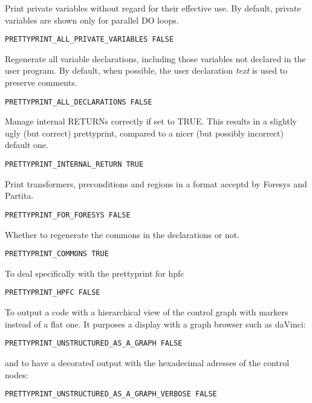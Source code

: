 Print private variables without regard for their effective use. By
default, private variables are shown only for parallel DO loops.

\begin{verbatim}
PRETTYPRINT_ALL_PRIVATE_VARIABLES FALSE
\end{verbatim}


Regenerate all variable declarations, including those variables not
declared in the user program. By default, when possible, the user
declaration {\em text} is used to preserve comments.

\begin{verbatim}
PRETTYPRINT_ALL_DECLARATIONS FALSE
\end{verbatim}

Manage internal RETURNs correctly if set to TRUE.  This results in a
slightly ugly (but correct) prettyprint, compared to a nicer (but
possibly incorrect) default one.

\begin{verbatim}
PRETTYPRINT_INTERNAL_RETURN TRUE
\end{verbatim}

Print transformers, preconditions and regions in a format acceptd by
Foresys and Partita.

\begin{verbatim}
PRETTYPRINT_FOR_FORESYS FALSE
\end{verbatim}

Whether to regenerate the commons in the declarations or not.

\begin{verbatim}
PRETTYPRINT_COMMONS TRUE
\end{verbatim}

To deal specifically with the prettyprint for hpfc

\begin{verbatim}
PRETTYPRINT_HPFC FALSE
\end{verbatim}

To output a code with a hierarchical view of the control graph with
markers instead of a flat one. It purposes a display with a graph
browser such as daVinci:

\begin{verbatim}
PRETTYPRINT_UNSTRUCTURED_AS_A_GRAPH FALSE
\end{verbatim}

and to have a decorated output with the hexadecimal adresses of the
control nodes:
\begin{verbatim}
PRETTYPRINT_UNSTRUCTURED_AS_A_GRAPH_VERBOSE FALSE
\end{verbatim}


